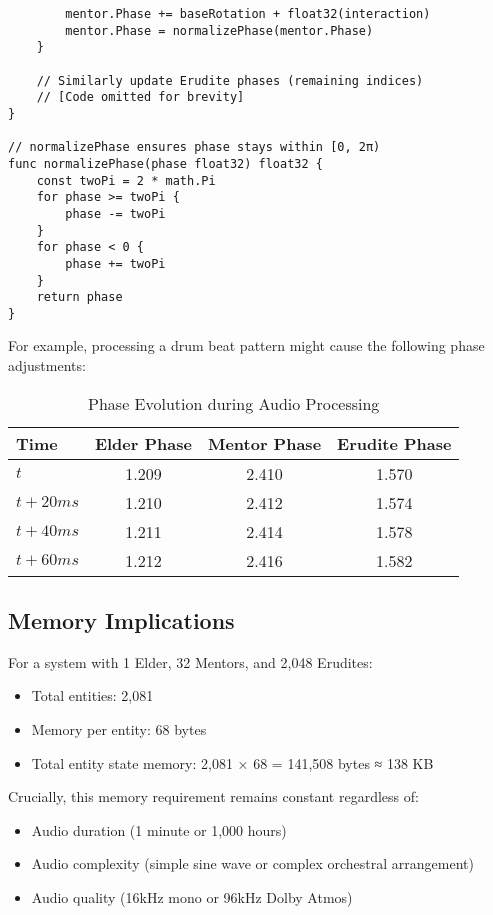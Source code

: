 \begin{tcolorbox}[colback=CodeBackground, colframe=DarkGray, title=Phase Evolution Code in Go, fonttitle=\bfseries]
\begin{verbatim}
        mentor.Phase += baseRotation + float32(interaction)
        mentor.Phase = normalizePhase(mentor.Phase)
    }
    
    // Similarly update Erudite phases (remaining indices)
    // [Code omitted for brevity]
}

// normalizePhase ensures phase stays within [0, 2π)
func normalizePhase(phase float32) float32 {
    const twoPi = 2 * math.Pi
    for phase >= twoPi {
        phase -= twoPi
    }
    for phase < 0 {
        phase += twoPi
    }
    return phase
}
\end{verbatim}
\end{tcolorbox}

For example, processing a drum beat pattern might cause the following phase adjustments:

\begin{table}[h]
\centering
\begin{tabular}{|l|c|c|c|}
\hline
\textbf{Time} & \textbf{Elder Phase} & \textbf{Mentor Phase} & \textbf{Erudite Phase} \\
\hline
$t$ & 1.209 & 2.410 & 1.570 \\
$t + 20ms$ & 1.210 & 2.412 & 1.574 \\
$t + 40ms$ & 1.211 & 2.414 & 1.578 \\
$t + 60ms$ & 1.212 & 2.416 & 1.582 \\
\hline
\end{tabular}
\caption{Phase Evolution during Audio Processing}
\end{table}

\subsection{Memory Implications}

For a system with 1 Elder, 32 Mentors, and 2,048 Erudites:
\begin{itemize}
    \item Total entities: 2,081
    \item Memory per entity: 68 bytes
    \item Total entity state memory: 2,081 × 68 = 141,508 bytes ≈ 138 KB
\end{itemize}

Crucially, this memory requirement remains constant regardless of:
\begin{itemize}
    \item Audio duration (1 minute or 1,000 hours)
    \item Audio complexity (simple sine wave or complex orchestral arrangement)
    \item Audio quality (16kHz mono or 96kHz Dolby Atmos)
\end{itemize}

